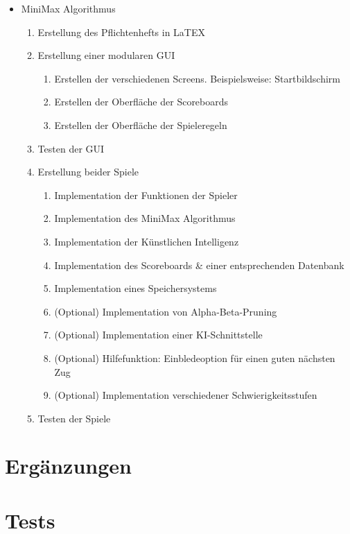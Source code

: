 \documentclass[14pt]{scrartcl}
\begin{document}
\begin{itemize}
    \item MiniMax Algorithmus
    \begin{enumerate}
        \item Erstellung des Pflichtenhefts in LaTEX
        \item Erstellung einer modularen GUI
        \begin{enumerate}
            \item Erstellen der verschiedenen Screens. Beispielsweise: Startbildschirm
            \item Erstellen der Oberfläche der Scoreboards
            \item Erstellen der Oberfläche der Spieleregeln
        \end{enumerate}
        \item Testen der GUI
        \item Erstellung beider Spiele
        \begin{enumerate}
            \item Implementation der Funktionen der Spieler
            \item Implementation des MiniMax Algorithmus
            \item Implementation der Künstlichen Intelligenz
            \item Implementation des Scoreboards \& einer entsprechenden Datenbank
            \item Implementation eines Speichersystems
            \item (Optional) Implementation von Alpha-Beta-Pruning
            \item (Optional) Implementation einer KI-Schnittstelle
            \item (Optional) Hilfefunktion: Einbledeoption für einen guten nächsten Zug
            \item (Optional) Implementation verschiedener Schwierigkeitsstufen
        \end{enumerate}
        \item Testen der Spiele
    \end{enumerate}
\end{itemize}

\newpage
\section{Ergänzungen}

\newpage
\section{Tests}
		
\end{document}
